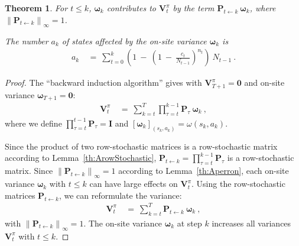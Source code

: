 \documentclass{article}
\newtheorem{theoremA}{Theorem}
\newcommand\BI{\bm{I}}
\newcommand\BP{\bm{P}}
\newcommand\BV{\bm{V}}
\newcommand\Bom{\bm{\omega}}
\newcommand\BZe{\bm{0}}
\renewcommand{\leq}{\leqslant}
\begin{document}
\begin{appendices}
\begin{theoremA}
\label{th:Aaffect}
  For $t \leq k$, $\Bom_k$ contributes to $\BV_t^{\pi}$
  by the term $\BP_{t \leftarrow k}  \ \Bom_k$, where $\left\| \BP_{t\leftarrow k} \right\|_{\infty}=1$.

The number $a_k$ of states affected by the on-site variance
$\Bom_k$ is
\begin{align}
 a_k   \ &= \ \sum_{t=0}^k \left( 1 \ - \   \left( 1 \ - \ \frac{c_t}{N_{t-1}} \right)^{n_t}
  \right) \ N_{t-1} \ .
\end{align}
\end{theoremA}



\begin{proof}
The ``backward induction algorithm'' \cite{Puterman:90,Puterman:05}
gives with $\BV_{T+1}^{\pi}=\BZe$ and on-site variance $\Bom_{T+1} =\BZe$:
\begin{align}
  \BV_t^{\pi} \ &= \   \sum_{k=t}^{T}  \prod_{\tau=t}^{k-1} \BP_{\tau} \
  \Bom_k \ ,
\end{align}
where we define $\prod_{\tau=t}^{t-1} \BP_{\tau}= \BI$ and $[\Bom_k]_{(s_k,a_k)}=\omega(s_k,a_k)$.

Since the product of two row-stochastic matrices is a row-stochastic
matrix according to Lemma~\ref{th:ArowStochastic},
$\BP_{t\leftarrow k}= \prod_{\tau=t}^{k-1} \BP_{\tau}$ is a row-stochastic matrix.
Since $\left\| \BP_{t\leftarrow k} \right\|_{\infty}=1$ according to Lemma~\ref{th:Aperron},
each on-site variance $\Bom_k$ with $t \leq k$ can have large effects on
$\BV_t^{\pi}$.
Using the row-stochastic matrices $\BP_{t\leftarrow k}$, we can
reformulate the variance:
\begin{align}
  \BV_t^{\pi} \ &= \   \sum_{k=t}^{T}  \BP_{t \leftarrow k} \ \Bom_k \ ,
\end{align}
with $\left\| \BP_{t\leftarrow k} \right\|_{\infty}=1$.
The on-site variance $\Bom_k$ at step $k$
increases all variances $\BV_t^{\pi}$ with $t \leq k$.


\end{proof}
\end{appendices}
\end{document}
